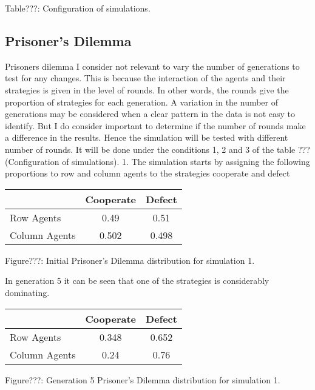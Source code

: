 \documentclass{article}
\begin{document}
\begin{center}
Table???: Configuration of simulations.
\end{center}


\subsection{Prisoner's Dilemma}
Prisoners dilemma
I consider not relevant to vary the number of generations to test for any changes. This is because the interaction of the agents and their strategies is given in the level of rounds. In other words, the rounds give the proportion of strategies for each generation. A variation in the number of generations may be considered when a clear pattern in the data is not easy to identify. But I do consider important to determine if the number of rounds make a difference in the results. Hence the simulation will be tested  with different number of rounds. It will be done under the conditions 1, 2 and 3 of the table ???(Configuration of simulations).
1.
The simulation starts by assigning the following proportions to row and column agents to the strategies cooperate and defect
\begin{center}
\begin{tabular}{|l|c|c|}
\hline
& Cooperate & Defect \\ 
\hline
Row Agents & 0.49 & 0.51\\
\hline
Column Agents & 0.502 & 0.498\\
\hline
\end{tabular}
\end{center}
\begin{center}
Figure???: Initial Prisoner’s Dilemma distribution for simulation 1.
\end{center}

In generation 5 it can be seen that one of the strategies is considerably dominating.
\begin{center}
\begin{tabular}{|l|c|c|}
\hline
& Cooperate & Defect \\ 
\hline
Row Agents & 0.348 & 0.652\\
\hline
Column Agents & 0.24 & 0.76\\
\hline
\end{tabular}
\end{center}
\begin{center}
Figure???: Generation 5 Prisoner’s Dilemma distribution for simulation 1.
\end{center}
\end{document}
